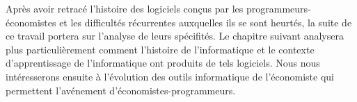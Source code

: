 Après avoir retracé l’histoire des logiciels conçus par les programmeurs-économistes et les difficultés récurrentes auxquelles ils se sont heurtés, la suite de ce travail portera sur l'analyse de leurs spécifités. Le chapitre suivant analysera plus particulièrement comment l'histoire de l'informatique et le contexte d'apprentissage de l'informatique ont produits de tels logiciels. Nous nous intéresserons ensuite à l'évolution des outils informatique de l'économiste qui permettent l'avénement d'économistes-programmeurs.